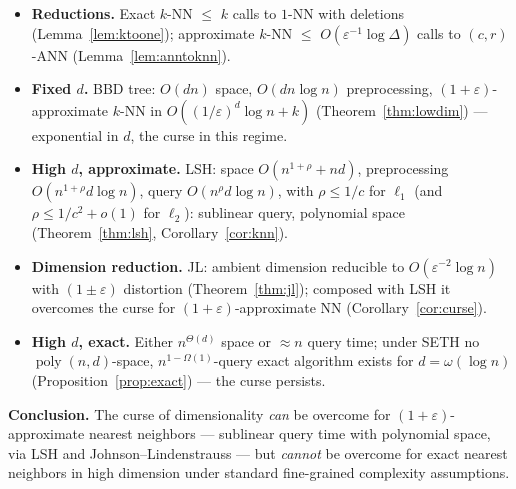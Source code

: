 \documentclass{amsart}
\DeclareMathOperator{\poly}{poly}
\newcommand{\eps}{\varepsilon}
\begin{document}
\begin{itemize}
\item \textbf{Reductions.} Exact $k$-NN $\le$ $k$ calls to $1$-NN with deletions
(Lemma~\ref{lem:ktoone}); approximate $k$-NN $\le$ $O(\eps^{-1}\log\Delta)$ calls to
$(c,r)$-ANN (Lemma~\ref{lem:anntoknn}).
\item \textbf{Fixed $d$.} BBD tree: $O(dn)$ space, $O(dn\log n)$ preprocessing,
$(1+\eps)$-approximate $k$-NN in $O((1/\eps)^d\log n+k)$ (Theorem~\ref{thm:lowdim}) —
exponential in $d$, the curse in this regime.
\item \textbf{High $d$, approximate.} LSH: space $O(n^{1+\rho}+nd)$, preprocessing
$O(n^{1+\rho}d\log n)$, query $O(n^{\rho}d\log n)$, with $\rho\le 1/c$ for $\ell_1$
(and $\rho\le 1/c^2+o(1)$ for $\ell_2$): sublinear query, polynomial space
(Theorem~\ref{thm:lsh}, Corollary~\ref{cor:knn}).
\item \textbf{Dimension reduction.} JL: ambient dimension reducible to
$O(\eps^{-2}\log n)$ with $(1\pm\eps)$ distortion (Theorem~\ref{thm:jl}); composed
with LSH it overcomes the curse for $(1+\eps)$-approximate NN
(Corollary~\ref{cor:curse}).
\item \textbf{High $d$, exact.} Either $n^{\Theta(d)}$ space or $\approx n$ query time;
under SETH no $\poly(n,d)$-space, $n^{1-\Omega(1)}$-query exact algorithm exists for
$d=\omega(\log n)$ (Proposition~\ref{prop:exact}) — the curse persists.
\end{itemize}

\noindent\textbf{Conclusion.} The curse of dimensionality \emph{can} be overcome for
$(1+\eps)$-approximate nearest neighbors — sublinear query time with polynomial space,
via LSH and Johnson--Lindenstrauss — but \emph{cannot} be overcome for exact nearest
neighbors in high dimension under standard fine-grained complexity assumptions.
\end{document}
